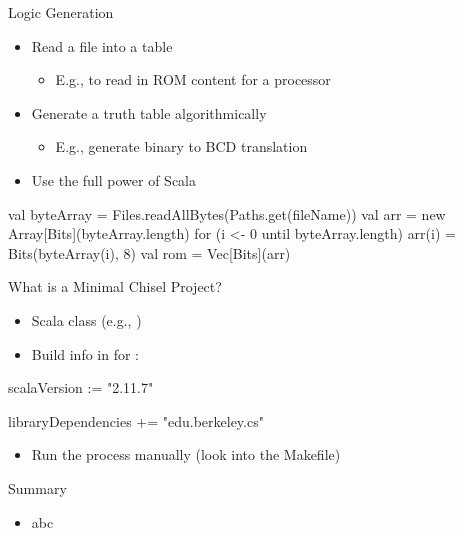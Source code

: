 \begin{frame}[fragile]{Logic Generation}
\begin{itemize}
\item Read a file into a table
\begin{itemize}
\item E.g., to read in ROM content for a processor
\end{itemize}
\item Generate a truth table algorithmically
\begin{itemize}
\item E.g., generate binary to BCD translation
\end{itemize}
\item Use the full power of Scala
\end{itemize}
\begin{chisel}
val byteArray = Files.readAllBytes(Paths.get(fileName))
val arr = new Array[Bits](byteArray.length)
for (i <- 0 until byteArray.length) {
  arr(i) = Bits(byteArray(i), 8)
}
val rom = Vec[Bits](arr)
\end{chisel}
\end{frame}
%

\begin{frame}[fragile]{What is a Minimal Chisel Project?}
\begin{itemize}
\item Scala class (e.g., )
\item Build info in  for :
\end{itemize}
\begin{chisel}
scalaVersion := "2.11.7"

libraryDependencies += "edu.berkeley.cs" %
\end{chisel}
\begin{itemize}
\item Run the process manually (look into the Makefile)
\end{itemize}
\end{frame}



\begin{frame}[fragile]{Summary}
\begin{itemize}
\item abc
\end{itemize}
\end{frame}
